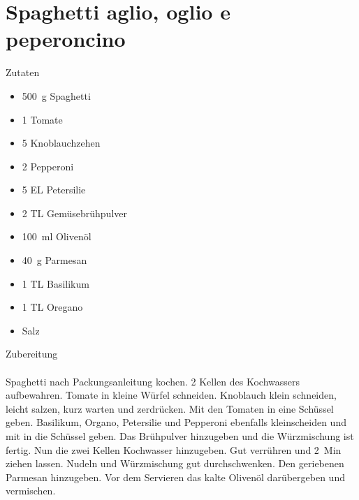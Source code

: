 \section*{Spaghetti aglio, oglio e peperoncino}
\ihead{}\ohead{}
\cfoot{}
{\Large Zutaten}
\begin{multicols}{2}
\begin{itemize}
    \item \SI{500}{g} Spaghetti
    \item \num{1} Tomate
    \item \num{5} Knoblauchzehen
    \item \num{2} Pepperoni
    \item \num{5} EL Petersilie
    \item \num{2} TL Gemüsebrühpulver 
    \item \SI{100}{ml} Olivenöl
    \item \SI{40}{g} Parmesan
    \item \num{1} TL Basilikum 
    \item \num{1} TL Oregano
    \item Salz
\end{itemize}
\end{multicols}
\noindent
{\Large Zubereitung}\\
\\
Spaghetti nach Packungsanleitung kochen.
2 Kellen des Kochwassers aufbewahren.
Tomate in kleine Würfel schneiden. 
Knoblauch klein schneiden, leicht salzen, kurz warten und zerdrücken. 
Mit den Tomaten in eine Schüssel geben.
Basilikum, Organo, Petersilie und Pepperoni ebenfalls kleinscheiden und mit in die Schüssel geben. 
Das Brühpulver hinzugeben und die Würzmischung ist fertig. 
Nun die zwei Kellen Kochwasser hinzugeben. 
Gut verrühren und \SI{2}{Min} ziehen lassen. 
Nudeln und Würzmischung gut durchschwenken. 
Den geriebenen Parmesan hinzugeben. 
Vor dem Servieren das kalte Olivenöl darübergeben und vermischen. 